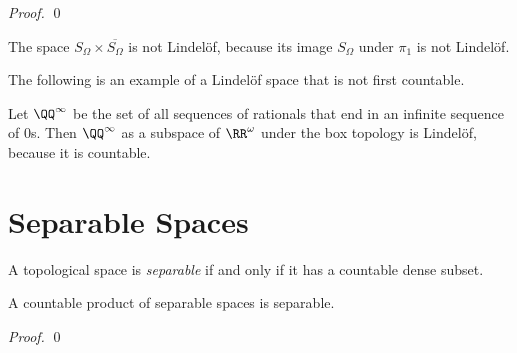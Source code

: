 \begin{proof}
    \pf
    \qed
\end{proof}

\begin{example}
    The space $S_\Omega \times \overline{S_\Omega}$ is not Lindel\"{o}f, because its image $S_\Omega$
    under $\pi_1$ is not Lindel\"{o}f.
\end{example}

The following is an example of a Lindel\"{o}f space that is not first countable.
\begin{example}[Choice]
    Let $\QQ^\infty$ be the set of all sequences of rationals that end in an
    infinite sequence of 0s. Then $\QQ^\infty$ as a subspace of $\RR^\omega$
    under the box topology is Lindel\"{o}f, because it is countable.
\end{example}

\section{Separable Spaces}

\begin{definition}[Separable]
    A topological space is \emph{separable} if and only if it has a countable dense
    subset.
\end{definition}

\begin{proposition}[AC]
    A countable product of separable spaces is separable.
\end{proposition}

\begin{proof}
    \pf
    \qed
\end{proof}

